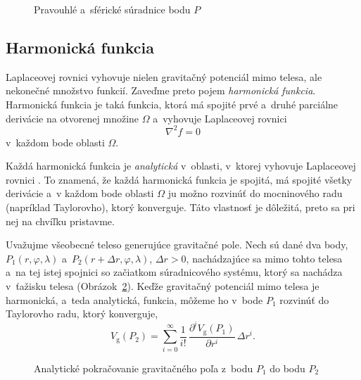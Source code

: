 \documentclass[a4paper, 12pt]{book}
\newcommand{\gidx}{\mathrm g}
\begin{document}
\begin{figure}
\centering

\caption{Pravouhlé a~sférické súradnice bodu $P$}
\label{fig:cart_sph}
\end{figure}





\subsection{Harmonická funkcia}

Laplaceovej rovnici vyhovuje nielen gravitačný potenciál mimo telesa, ale 
nekonečné množstvo funkcií.  Zaveďme preto pojem \emph{harmonická funkcia}.  
Harmonická funkcia je taká funkcia, ktorá má spojité prvé a~druhé parciálne 
derivácie na otvorenej množine $\Omega$ a~vyhovuje Laplaceovej rovnici
%
\begin{equation}
\nabla^2 f = 0
\end{equation}
%
v~každom bode oblasti $\Omega$.

Každá harmonická funkcia je \emph{analytická} v~oblasti, v~ktorej vyhovuje 
Laplaceovej rovnici \citep{MoritzPhysicalGeodesy}.  To znamená, že každá 
harmonická funkcia je spojitá, má spojité všetky derivácie a~v každom bode 
oblasti $\Omega$ ju možno rozvinúť do mocninového radu (napríklad Taylorovho), 
ktorý konverguje.  Táto vlastnosť je dôležitá, preto sa pri nej na chvíľku 
pristavme.

Uvažujme všeobecné teleso generujúce gravitačné pole.  Nech sú dané dva body, 
$P_1(r, \varphi, \lambda)$ a~$P_2(r + \Delta r, \varphi, \lambda)$, $\Delta 
r > 0$, nachádzajúce sa mimo tohto telesa a~na tej istej spojnici so začiatkom 
súradnicového systému, ktorý sa nachádza v~ťažisku telesa 
(Obrázok~\ref{fig:analytical_continuation}).  Keďže gravitačný potenciál mimo 
telesa je harmonická, a~teda analytická, funkcia, môžeme ho v~bode $P_1$ 
rozvinúť do Taylorovho radu, ktorý konverguje,
%
\begin{equation}
\label{eq:vg_analytical_continuation}
V_\gidx(P_2) = \sum_{i = 0}^\infty \frac{1}{i!} \, \frac{\partial^i 
V_\gidx(P_1)}{\partial r^i} \, \Delta r^i{.}
\end{equation}

\begin{figure}
\centering

\caption{Analytické pokračovanie gravitačného poľa z~bodu $P_1$ do bodu $P_2$}
\label{fig:analytical_continuation}
\end{figure}
\end{document}
